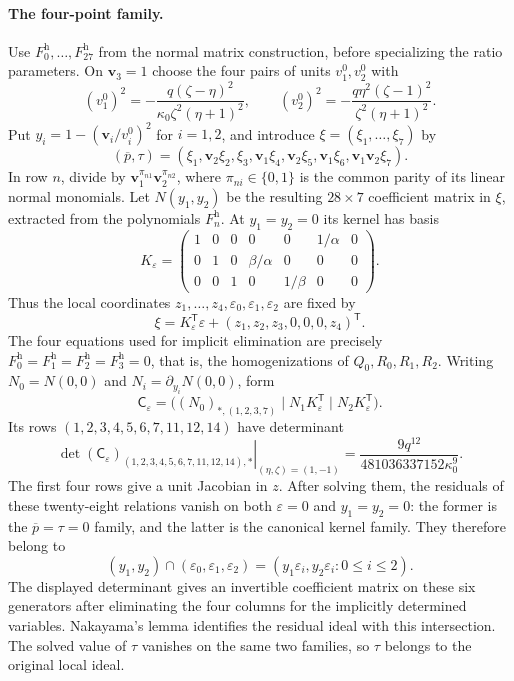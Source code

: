 \documentclass[11pt,a4paper]{article}
\numberwithin{equation}{section}
\theoremstyle{plain}
\theoremstyle{definition}
\theoremstyle{remark}
\begin{document}
\paragraph{The four-point family.}
Use $F_0^{\mathrm h},\ldots,F_{27}^{\mathrm h}$ from the normal matrix
construction, before specializing the ratio parameters. On $\boldsymbol v_3=1$
choose the four pairs of units $v_1^0,v_2^0$ with
\[
 (v_1^0)^2=-\frac{q(\zeta-\eta)^2}{\kappa_0\zeta^2(\eta+1)^2},\qquad
 (v_2^0)^2=-\frac{q\eta^2(\zeta-1)^2}{\zeta^2(\eta+1)^2}.
\]
Put $y_i=1-(\boldsymbol v_i/v_i^0)^2$ for $i=1,2$, and introduce
$\xi=(\xi_1,\ldots,\xi_7)$ by
\[
 (\overline p,\tau)=
 (\xi_1,\boldsymbol v_2\xi_2,\xi_3,
 \boldsymbol v_1\xi_4,\boldsymbol v_2\xi_5,\boldsymbol v_1\xi_6,
 \boldsymbol v_1\boldsymbol v_2\xi_7).
\]
In row $n$, divide by $\boldsymbol v_1^{\pi_{n1}}
\boldsymbol v_2^{\pi_{n2}}$, where $\pi_{ni}\in\{0,1\}$ is the
common parity of its linear normal monomials. Let $N(y_1,y_2)$ be the
resulting $28\times7$ coefficient matrix in $\xi$, extracted from the
polynomials $F_n^{\mathrm h}$. At $y_1=y_2=0$ its kernel has basis
\[
 K_\varepsilon=\begin{pmatrix}
 1&0&0&0&0&1/\alpha&0\\
 0&1&0&\beta/\alpha&0&0&0\\
 0&0&1&0&1/\beta&0&0
 \end{pmatrix}.
\]
Thus the local coordinates $z_1,\ldots,z_4,\varepsilon_0,\varepsilon_1,
\varepsilon_2$ are fixed by
\[
 \xi=K_\varepsilon^{\mathsf T}\varepsilon
             +(z_1,z_2,z_3,0,0,0,z_4)^{\mathsf T}.
\]
The four equations used for implicit elimination are precisely
$F_0^{\mathrm h}=F_1^{\mathrm h}=F_2^{\mathrm h}=F_3^{\mathrm h}=0$,
that is, the homogenizations of $Q_0,R_0,R_1,R_2$.
Writing $N_0=N(0,0)$ and $N_i=\partial_{y_i}N(0,0)$, form
\[
 \mathsf C_\varepsilon=
 \bigl((N_0)_{*,(1,2,3,7)}\mid
           N_1K_\varepsilon^{\mathsf T}\mid
           N_2K_\varepsilon^{\mathsf T}\bigr).
\]
Its rows $(1,2,3,4,5,6,7,11,12,14)$ have determinant
\[
 \left.\det(\mathsf C_\varepsilon)_{(1,2,3,4,5,6,7,11,12,14),*}
 \right|_{(\eta,\zeta)=(1,-1)}
       =\frac{9q^{12}}{481036337152\kappa_0^9}.
\]
The first four rows give a unit Jacobian in $z$. After solving them,
the residuals of these twenty-eight relations vanish on both
$\varepsilon=0$ and $y_1=y_2=0$:
the former is the $\overline p=\tau=0$ family, and the latter is the
canonical kernel family. They therefore belong to
\[
 (y_1,y_2)\cap(\varepsilon_0,\varepsilon_1,\varepsilon_2)
   =(y_1\varepsilon_i,y_2\varepsilon_i:0\le i\le2).
\]
The displayed determinant gives an invertible coefficient matrix on
these six generators after eliminating the four columns for the implicitly determined variables.
Nakayama's lemma identifies the residual ideal with this intersection.
The solved value of $\tau$ vanishes on the same two families, so
$\tau$ belongs to the original local ideal.
\end{document}
